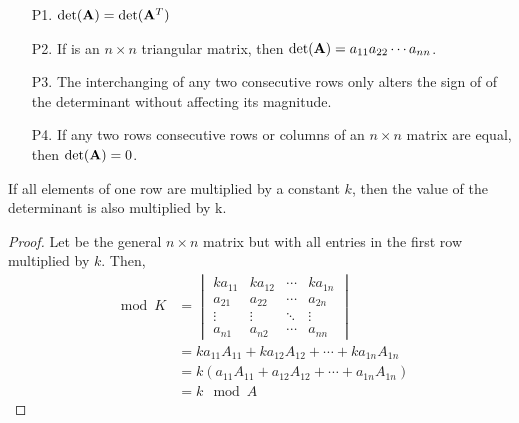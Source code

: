 \begin{enumerate}
  \item [P1.] $\det(\mathbf{A}) = \det(\mathbf{A}^T)$
  \item [P2.] If  is an $n \times n$ triangular matrix, then $\det(\mathbf{A}) = a_{11}a_{22}\cdots a_{nn}$.
  \item [P3.] The interchanging of any two consecutive rows only alters the sign of of the determinant without affecting its magnitude.
  \item [P4.] If any two rows consecutive rows or columns of an $n \times n$ matrix  are equal, then $\det(\mathbf{A}) = 0$.  
\end{enumerate}
\newpage
  \begin{theorem}\label{thm:scalar-out}
    If all elements of one row are multiplied by a constant $k$, then the value of the determinant is also multiplied by k.
  \end{theorem}

\begin{proof}
    Let  be the general $n \times n$ matrix  but with all entries in the first row multiplied by $k$. Then,
    \begin{align*}
      \mod{K} &=
    \begin{vmatrix} 
      ka_{11} & ka_{12} & \cdots & ka_{1n}\\
      a_{21} & a_{22} & \cdots & a_{2n}\\
      \vdots & \vdots & \ddots & \vdots\\
      a_{n1} & a_{n2} & \cdots & a_{nn}
    \end{vmatrix}\\
              &= ka_{11}A_{11} + ka_{12}A_{12} + \cdots + ka_{1n}A_{1n}\\
              &= k(a_{11}A_{11} + a_{12}A_{12} + \cdots + a_{1n}A_{1n})\\
              &= k\mod{A}
    \end{align*}
\end{proof}

